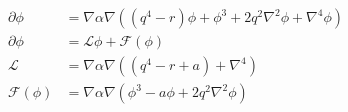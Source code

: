 \documentclass[10pt]{article}
\begin{document}
\begin{align*}\partial \phi  &= \nabla\alpha\nabla\left(\left(q^4-r\right)\phi + \phi^3 + 2q^2\nabla^2\phi + \nabla^4\phi\right)
\\
\partial\phi &= \mathcal{L}\phi + \mathcal{F}\left(\phi\right)
\\
\mathcal{L} &= \nabla\alpha\nabla\left(\left(q^4-r+a\right) + \nabla^4\right)
\\
\mathcal{F}\left(\phi\right) &= \nabla\alpha\nabla\left( \phi^3 - a\phi +2q^2\nabla^2\phi \right)\end{align*}
\end{document}
